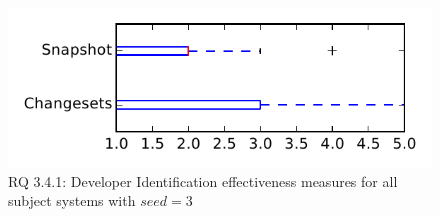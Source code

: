 
\begin{figure}
\centering
\includegraphics[height=0.4\textheight]{figures/dit_seed/rq1_tiny_3}
\caption{RQ 3.4.1: Developer Identification effectiveness measures for all subject systems with $seed=3$}
\label{fig:dit_seed:rq1:tiny}
\end{figure}
